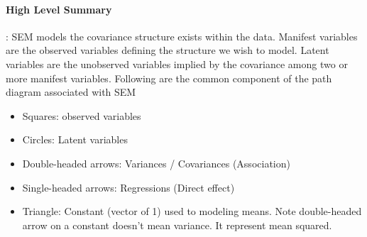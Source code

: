 \paragraph{High Level Summary}: SEM models the covariance structure exists within the data. Manifest variables are the observed variables defining the structure we wish to model. Latent variables are the unobserved variables implied by the covariance among two or more manifest variables. Following are the common component of the path diagram associated with SEM
    \begin{itemize}
        \item Squares: observed variables
        \item Circles: Latent variables
        \item Double-headed arrows: Variances / Covariances (Association)
        \item Single-headed arrows: Regressions (Direct effect) 
        \item Triangle: Constant (vector of 1) used to modeling means. Note double-headed arrow on a constant doesn't mean variance. It represent mean squared. 
    \end{itemize}
    
